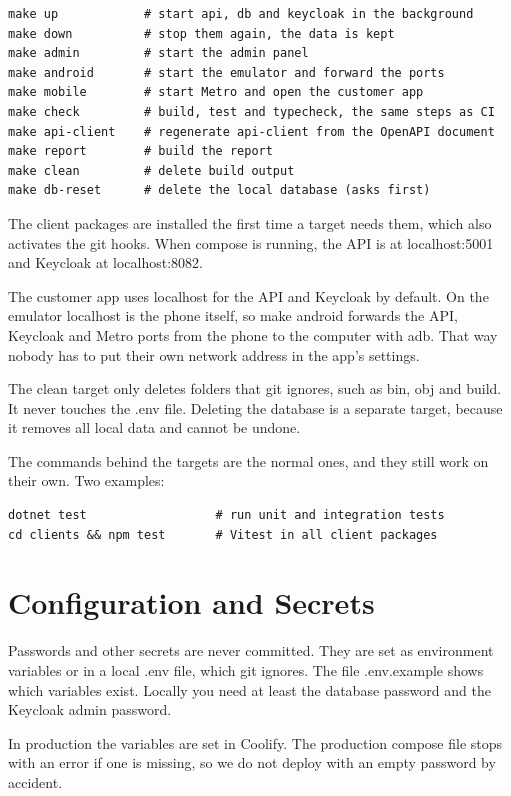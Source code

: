 \documentclass[a4paper,11pt]{article}
\begin{document}
\begin{lstlisting}
make up            # start api, db and keycloak in the background
make down          # stop them again, the data is kept
make admin         # start the admin panel
make android       # start the emulator and forward the ports
make mobile        # start Metro and open the customer app
make check         # build, test and typecheck, the same steps as CI
make api-client    # regenerate api-client from the OpenAPI document
make report        # build the report
make clean         # delete build output
make db-reset      # delete the local database (asks first)
\end{lstlisting}

The client packages are installed the first time a target needs them, which also activates the git hooks. When compose is running, the API is at localhost:5001 and Keycloak at localhost:8082.

The customer app uses localhost for the API and Keycloak by default. On the emulator localhost is the phone itself, so make android forwards the API, Keycloak and Metro ports from the phone to the computer with adb. That way nobody has to put their own network address in the app's settings.

The clean target only deletes folders that git ignores, such as bin, obj and build. It never touches the .env file. Deleting the database is a separate target, because it removes all local data and cannot be undone.

The commands behind the targets are the normal ones, and they still work on their own. Two examples:
\begin{lstlisting}
dotnet test                  # run unit and integration tests
cd clients && npm test       # Vitest in all client packages
\end{lstlisting}

\section{Configuration and Secrets}
Passwords and other secrets are never committed. They are set as environment variables or in a local .env file, which git ignores. The file .env.example shows which variables exist. Locally you need at least the database password and the Keycloak admin password.

In production the variables are set in Coolify. The production compose file stops with an error if one is missing, so we do not deploy with an empty password by accident.
\end{document}
